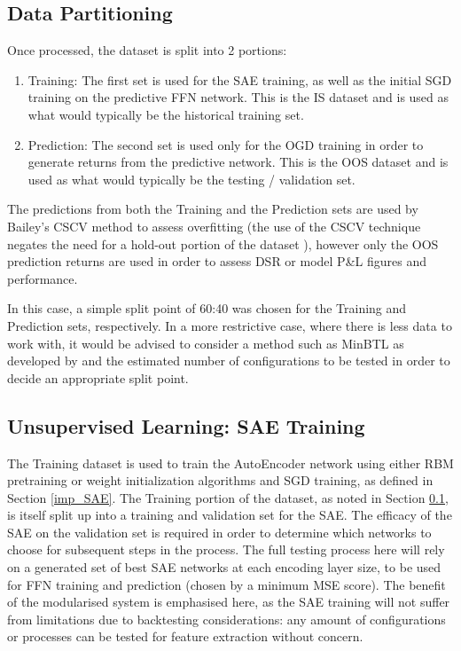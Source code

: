 \documentclass[a4paper,11pt,oneside]{article}
\theoremstyle{plain}
\theoremstyle{definition}
\begin{document}
	\subsection{Data Partitioning}\label{proc_dataseg}
	
	Once processed, the dataset is split into 2 portions: 
	\begin{enumerate}
		\item Training: The first set is used for the SAE training, as well as the initial SGD training on the predictive FFN network. This is the IS dataset and is used as what would typically be the historical training set.
		\item Prediction: The second set is used only for the OGD training in order to generate returns from the predictive network. This is the OOS dataset and is used as what would typically be the testing / validation set.
	\end{enumerate}
	
	The predictions from both the Training and the Prediction sets are used by Bailey's CSCV method to assess overfitting (the use of the CSCV technique negates the need for a hold-out portion of the dataset \citep{BailyPBO}), however only the OOS prediction returns are used in order to assess DSR or model P\&L figures and performance. \newline
	
	In this case, a simple split point of 60:40 was chosen for the Training and Prediction sets, respectively. In a more restrictive case, where there is less data to work with, it would be advised to consider a method such as MinBTL as developed by \citet{BaileyBTL} and the estimated number of configurations to be tested in order to decide an appropriate split point.
	
	\subsection{Unsupervised Learning: SAE Training}\label{proc_sae}
	
	The Training dataset is used to train the AutoEncoder network using either RBM pretraining or weight initialization algorithms and SGD training, as defined in Section \ref{imp_SAE}. The Training portion of the dataset, as noted in Section \ref{proc_dataseg}, is itself split up into a training and validation set for the SAE. The efficacy of the SAE on the validation set is required in order to determine which networks to choose for subsequent steps in the process. The full testing process here will rely on a generated set of best SAE networks at each encoding layer size, to be used for FFN training and prediction (chosen by a minimum MSE score). The benefit of the modularised system is emphasised here, as the SAE training will not suffer from limitations due to backtesting considerations: any amount of configurations or processes can be tested for feature extraction without concern. \newline
	
\end{document}
